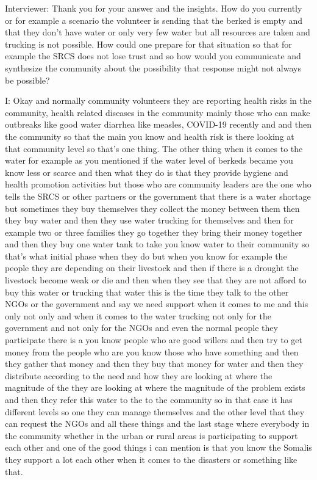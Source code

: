 Interviewer:  Thank you for your answer and the insights. How do you currently or for example a scenario the volunteer is sending that the berked is empty and that they don't have water or only very few water but all resources are taken and trucking is not possible. How could one prepare for that situation so that for example the SRCS does not lose trust and so how would you communicate and synthesize the community about the possibility that response might not always be possible?

I:  Okay and normally community volunteers they are reporting health risks in the community, health related diseases in the community mainly those who can make outbreaks like good water diarrhea like measles, COVID-19 recently and and then the community so that the main you know and health risk is there looking at that community level so that's one thing. The other thing when it comes to the water for example as you mentioned if the water level of berkeds became you know less or scarce and then what they do is that they provide hygiene and health promotion activities but those who are community leaders are the one who tells the SRCS or other partners or the government that there is a water shortage but sometimes they buy themselves they collect the money between them then they buy water and then they use water trucking for themselves and then for example two or three families they go together they bring their money together and then they buy one water tank to take you know water to their community so that's what initial phase when they do but when you know for example the people they are depending on their livestock and then if there is a drought the livestock become weak or die and then when they see that they are not afford to buy this water or trucking that water this is the time they talk to the other NGOs or the government and say we need support when it comes to me and this only not only and when it comes to the water trucking not only for the government and not only for the NGOs and even the normal people they participate there is a you know people who are good willers and then try to get money from the people who are you know those who have something and then they gather that money and then they buy that money for water and then they distribute according to the need and how they are looking at where the magnitude of the they are looking at where the magnitude of the problem exists and then they refer this water to the to the community so in that case it has different levels so one they can manage themselves and the other level that they can request the NGOs and all these things and the last stage where everybody in the community whether in the urban or rural areas is participating to support each other and one of the good things i can mention is that you know the Somalis they support a lot each other when it comes to the disasters or something like that. 

